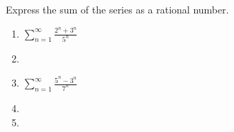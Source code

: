 Express the sum of the series as a rational number.
\begin{multicols}{2}
\begin{enumerate}[ref={\fcProblemRef}]
\item 
\label{problemSum(2^n+3^n)/(5^n)}
$
\displaystyle \sum\limits_{n=1}^{\infty} \frac{2^n+3^n}{5^n}
$


\item  
\item \label{problemSum(3^n+5^n)/(7^n)}
$\displaystyle
\sum\limits_{n=1}^{\infty} \frac{5^n-3^n}{7^n}
$

\item 
\item  
\end{enumerate}
\end{multicols}